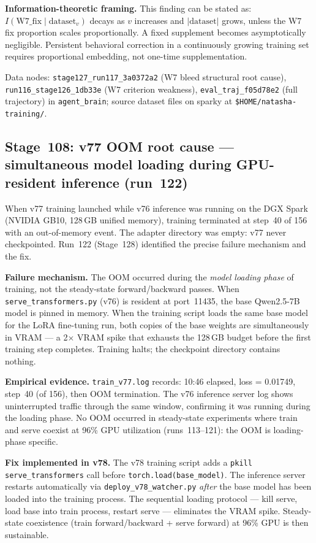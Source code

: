 \documentclass[11pt]{article}
\begin{document}
\textbf{Information-theoretic framing.} This finding can be stated as:
$I(\text{W7\_fix}\mid\text{dataset}_{v})$ decays as $v$ increases and
$|\text{dataset}|$ grows, unless the W7 fix proportion scales proportionally.
A fixed supplement becomes asymptotically negligible. Persistent behavioral
correction in a continuously growing training set requires proportional embedding,
not one-time supplementation.

Data nodes: \texttt{stage127\_run117\_3a0372a2} (W7 bleed structural root cause),
\texttt{run116\_stage126\_1db33e} (W7 criterion weakness), \texttt{eval\_traj\_f05d78e2}
(full trajectory) in \texttt{agent\_brain}; source dataset files on sparky
at \texttt{\$HOME/natasha-training/}.


\subsection{Stage~108: v77 OOM root cause --- simultaneous model loading during GPU-resident inference (run~122)}

When v77 training launched while v76 inference was running on the DGX Spark
(NVIDIA GB10, 128\,GB unified memory), training terminated at step~40 of 156
with an out-of-memory event. The adapter directory was empty: v77 never
checkpointed. Run~122 (Stage~128) identified the precise failure mechanism and
the fix.

\textbf{Failure mechanism.} The OOM occurred during the \emph{model loading phase}
of training, not the steady-state forward/backward passes.
When \texttt{serve\_transformers.py} (v76) is resident at port~11435, the base
Qwen2.5-7B model is pinned in memory. When the training script loads the same
base model for the LoRA fine-tuning run, both copies of the base weights are
simultaneously in VRAM --- a 2$\times$ VRAM spike that exhausts the 128\,GB
budget before the first training step completes. Training halts; the checkpoint
directory contains nothing.

\textbf{Empirical evidence.}
\texttt{train\_v77.log} records: 10:46 elapsed, loss = 0.01749,
step~40 (of 156), then OOM termination. The v76 inference server log
shows uninterrupted traffic through the same window, confirming it was
running during the loading phase. No OOM occurred in steady-state experiments
where train and serve coexist at 96\% GPU utilization (runs~113--121):
the OOM is loading-phase specific.

\textbf{Fix implemented in v78.} The v78 training script adds a
\texttt{pkill serve\_transformers} call before \texttt{torch.load(base\_model)}.
The inference server restarts automatically via \texttt{deploy\_v78\_watcher.py}
\emph{after} the base model has been loaded into the training process.
The sequential loading protocol --- kill serve, load base into train process,
restart serve --- eliminates the VRAM spike. Steady-state coexistence (train
forward/backward + serve forward) at 96\% GPU is then sustainable.
\end{document}
